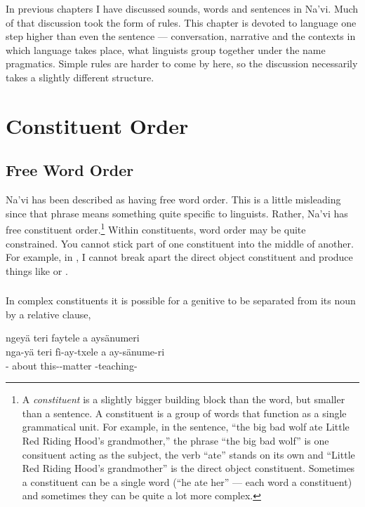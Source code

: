 
\noindent In previous chapters I have discussed sounds, words and
sentences in Na'vi.  Much of that discus\-sion took the form of rules.
This chapter is devoted to language one step higher than even the
sentence --- conversation, narrative and the contexts in which
language takes place, what linguists group together under the name
pragmatics.  Simple rules are harder to come by here, so the
discussion necessarily takes a slightly different structure.


\section{Constituent Order}

\subsection{Free Word Order} Na'vi has been described as having free
word order.  This is a little misleading since that phrase means
something quite specific to linguists.  Rather, Na'vi has free
constituent order.\footnote{A \textit{constituent} is a slightly
bigger building block than the word, but smaller than a sentence.  A
constituent is a group of words that function as a single
grammatical unit.  For example, in the sentence, ``the big bad wolf
ate Little Red Riding Hood's grandmother,'' the phrase ``the big bad
wolf'' is one consituent acting as the subject, the verb ``ate''
stands on its own and ``Little Red Riding Hood's grandmother'' is
the direct object constituent.  Sometimes a constituent can be a
single word (``he ate her'' --- each word a constituent) and
sometimes they can be quite a lot more complex.}  Within
constituents, word order may be quite constrained.  You cannot stick
part of one constituent into the middle of another.  For example, in
 ,
I cannot break apart the direct object constituent 
and produce things like  or .

\subsubsection{} In complex constituents it is possible for a genitive
to be separated from its noun by a relative clause,

\begin{interlin}
\glll ngeyä teri faytele a aysänumeri \\
   nga-yä teri fì-ay-txele a ay-sänume-ri \\
   - about this--matter  -teaching-\\
\end{interlin}

